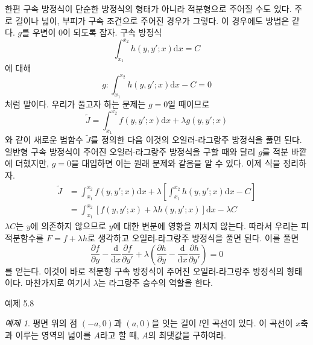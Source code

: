 \documentclass[chapter, oneside, b5paper]{oblivoir}
\theoremstyle{plain}
\theoremstyle{definition}
\theoremstyle{remark}
\newtheorem{example}{예제}[chapter]    %
\begin{document}
한편 구속 방정식이 단순한 방정식의 형태가 아니라 적분형으로 주어질 수도 있다. 주로 길이나 넓이, 부피가 구속 조건으로 주어진 경우가 그렇다. 이 경우에도 방법은 같다. $g$를 우변이 0이 되도록 잡자. 구속 방정식
\begin{equation}
    \int_{x_1}^{x_2} h(y, y'; x) \mathrm{d}x = C
    \label{eq:5.65}
\end{equation}
에 대해
\begin{equation}
    g : \int_{x_1}^{x_2} h(y, y'; x) \mathrm{d}x - C = 0
    \label{eq:5.66}
\end{equation}
처럼 말이다. 우리가 풀고자 하는 문제는 $g=0$일 때이므로
\begin{equation}
    \tilde{J} = \int_{x_1}^{x_2} f(y, y' ;x)\mathrm{d}x + \lambda g(y, y';x)
    \label{eq:5.64}
\end{equation}
와 같이 새로운 범함수 $\tilde{J}$를 정의한 다음 이것의 오일러-라그랑주 방정식을 풀면 된다. 일반형 구속 방정식이 주어진 오일러-라그랑주 방정식을 구할 때와 달리 $g$를 적분 바깥에 더했지만, $g = 0$을 대입하면 이는 원래 문제와 같음을 알 수 있다. 이제 식을 정리하자.
\begin{equation}
    \begin{aligned}
        \tilde{J} &= \int_{x_1}^{x_2} f(y, y' ;x)\mathrm{d}x + \lambda\left[ \int_{x_1}^{x_2} h(y, y'; x) \mathrm{d}x - C\right] \\
        &= \int_{x_1}^{x_2} [f(y, y' ;x) + \lambda h(y, y';x) ]\mathrm{d}x - \lambda C
    \end{aligned}
\end{equation}
$\lambda C$는 $y$에 의존하지 않으므로 $y$에 대한 변분에 영향을 끼치지 않는다. 따라서 우리는 피적분함수를 $F=f+\lambda h$로 생각하고 오일러-라그랑주 방정식을 풀면 된다. 이를 풀면
\begin{equation}
    \frac{\partial f}{\partial y} - \frac{\mathrm{d}}{\mathrm{d}x}\frac{\partial f}{\partial y'} + \lambda \left(\frac{\partial h}{\partial y} - \frac{\mathrm{d}}{\mathrm{d}x} \frac{\partial h}{\partial y'} \right) = 0
    \label{eq:5.69}
\end{equation}
를 얻는다. 이것이 바로 적분형 구속 방정식이 주어진 오일러-라그랑주 방정식의 형태이다. 마찬가지로 여기서 $\lambda$는 라그랑주 승수의 역할을 한다.

\begin{examplebox}{예제 5.8}
\begin{example}
평면 위의 점 $(-a, 0)$과 $(a, 0)$을 잇는 길이 $l$인 곡선이 있다. 이 곡선이 $x$축과 이루는 영역의 넓이를 $A$라고 할 때, $A$의 최댓값을 구하여라.
\end{example}
\end{examplebox}
\end{document}
